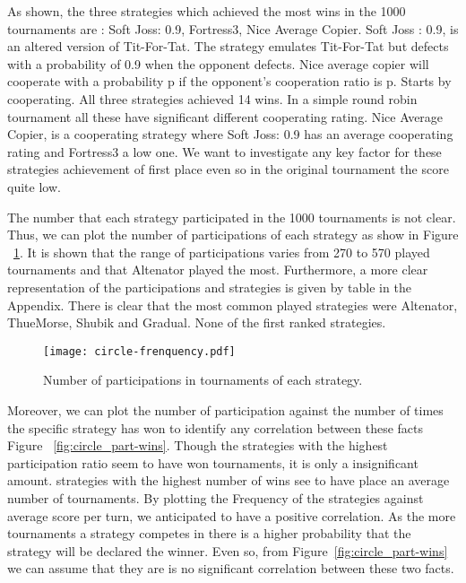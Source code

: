 As shown, %
the three strategies which achieved the most wins in the 1000 tournaments are :
Soft Joss: 0.9, Fortress3, Nice Average Copier. Soft Joss : 0.9, is an altered
version of Tit-For-Tat. The strategy emulates Tit-For-Tat but defects with a
probability of 0.9 when the opponent defects. Nice average copier will cooperate
with a probability p if the opponent's cooperation ratio is p. Starts by cooperating.
All three strategies achieved 14 wins. In a simple round robin tournament
all these have significant  different cooperating rating. Nice Average Copier,
is a cooperating strategy
where Soft Joss: 0.9 has an average cooperating rating and Fortress3 a low one.
We want to investigate any key factor for these strategies
achievement of first place even so in the original tournament the score quite
low.

The number that each strategy participated in the 1000 tournaments
is not clear. Thus, we can plot the number of participations of each strategy
as show in Figure ~\ref{fig:circle_freq}. It is shown that the range of participations varies
from 270 to 570 played tournaments and that Altenator played the most.
Furthermore, a more clear representation of the participations and strategies is
given by table in the Appendix. There is clear that the most common played
strategies were Altenator, ThueMorse, Shubik and Gradual. None of the first ranked
strategies.

\begin{figure}[h!]
\centering
    \texttt{[image: circle-frenquency.pdf]}
    \caption{Number of participations in tournaments of each strategy.}
    \label{fig:circle_freq}
\end{figure}

Moreover, we can plot the number of participation against the number of times
the specific strategy has won to identify any correlation between these facts
Figure ~\ref{fig:circle_part-wins}. Though the strategies with the highest participation
ratio seem to have won tournaments, it is only a insignificant amount. strategies
with the highest number of wins see to have place an average number of tournaments.
By plotting the Frequency of the strategies against average score per turn,
we anticipated to have a positive correlation. As the more tournaments a strategy
competes in there is a higher probability that the strategy will be declared
the winner. Even so, from Figure~\ref{fig:circle_part-wins} we can assume that
they are is no significant correlation between these two facts.


